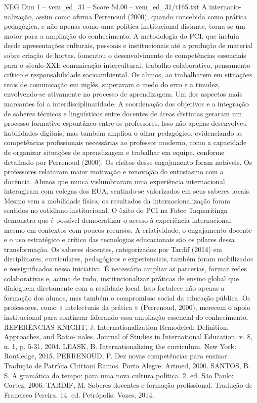 \begin{textsample}{NEG Dim 1 – vem\_ed\_31 – Score 54.00 – vem\_ed\_31/t165.txt}
A internacio- nalização, assim como afirma Perrenoud (2000), quando concebida como prática pedagógica, e não apenas como uma política institucional distante, torna-se um motor para a ampliação do conhecimento.
A metodologia do PCI, que incluiu desde apresentações culturais, pessoais e institucionais até a produção de material sobre criação de hortas, fomentou o desenvolvimento de competências essenciais para o século XXI: comunicação intercultural, trabalho colaborativo, pensamento crítico e responsabilidade socioambiental.
Os alunos, ao trabalharem em situações reais de comunicação em inglês, superaram o medo do erro e a timidez, envolvendo-se ativamente no processo de aprendizagem.
Um dos aspectos mais marcantes foi a interdisciplinaridade.
A coordenação dos objetivos e a integração de saberes técnicos e linguísticos entre docentes de áreas distintas geraram um processo formativo espontâneo entre os professores.
Isso não apenas desenvolveu habilidades digitais, mas também ampliou o olhar pedagógico, evidenciando as competências profissionais necessárias ao professor moderno, como a capacidade de organizar situações de aprendizagem e trabalhar em equipe, conforme detalhado por Perrenoud (2000).
Os efeitos desse engajamento foram notáveis.
Os professores relataram maior motivação e renovação do entusiasmo com a docência.
Alunos que nunca vislumbraram uma experiência internacional interagiram com colegas dos EUA, sentindo-se valorizados em seus saberes locais.
Mesmo sem a mobilidade física, os resultados da internacionalização foram sentidos no cotidiano institucional.
O êxito do PCI na Fatec Taquaritinga demonstra que é possível democratizar o acesso à experiência internacional mesmo em contextos com poucos recursos.
A criatividade, o engajamento docente e o uso estratégico e crítico das tecnologias educacionais são os pilares dessa transformação.
Os saberes docentes, categorizados por Tardif (2014) em disciplinares, curriculares, pedagógicos e experienciais, também foram mobilizados e ressignificados nessa iniciativa.
É necessário ampliar as parcerias, formar redes colaborativas e, acima de tudo, institucionalizar práticas de ensino global que dialoguem diretamente com a realidade local.
Isso fortalece não apenas a formação dos alunos, mas também o compromisso social da educação pública.
Os professores, como « intelectuais da prática » (Perrenoud, 2000), merecem o apoio institucional para continuar liderando essa ampliação essencial do conhecimento.
REFERÊNCIAS KNIGHT, J.
Internationalization Remodeled: Definition, Approaches, and Ratio- nales.
Journal of Studies in International Education, v. 8, n. 1, p. 5-31, 2004.
LEASK, B.
Internationalizing the curriculum.
New York: Routledge, 2015.
PERRENOUD, P.
Dez novas competências para ensinar.
Tradução de Patrícia Chittoni Ramos.
Porto Alegre: Artmed, 2000.
SANTOS, B.
S.
A gramática do tempo: para uma nova cultura política. 2. ed.
São Paulo: Cortez, 2006.
TARDIF, M.
Saberes docentes e formação profissional.
Tradução de Francisco Pereira. 14. ed.
Petrópolis: Vozes, 2014.

\end{textsample}
